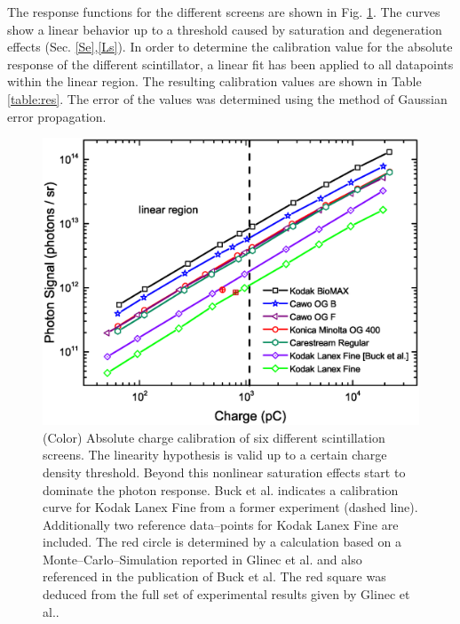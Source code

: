 \documentclass[%
preprint,
amsmath,
amssymb,
aip,
rsi, 
numerical,
floatfix,
]{revtex4-1}
\begin{document}


The response functions for the different screens are shown in Fig. \ref{fig:Calib}.
The curves show a linear behavior up to a threshold caused by saturation and degeneration effects (Sec. \ref{Se},\ref{Ls}).  
In order to determine the calibration value for the absolute response of the different scintillator, a linear fit has been applied to all datapoints within the linear region.
The resulting calibration values are shown in Table \ref{table:res}. 
The error of the values was determined using the method of Gaussian error propagation.
   
\begin{figure}
\includegraphics[width=\textwidth]{./Figures/Absolute}%
\caption{\label{fig:Calib}(Color) Absolute charge calibration of six different scintillation screens.
The linearity hypothesis is valid up to a certain charge density threshold. Beyond this nonlinear saturation effects start to dominate the photon response.
Buck et al. indicates a calibration curve for Kodak Lanex Fine from a former experiment \cite{Buck2010} (dashed line).
Additionally two reference data--points for Kodak Lanex Fine are included. 
The red circle is determined by a calculation based on a Monte--Carlo--Simulation reported in Glinec et al. \cite{Glinec2006} and also referenced in the publication of Buck et al. 
The red square was deduced from the full set of experimental results given by Glinec et al.. }
\end{figure}
\end{document}
